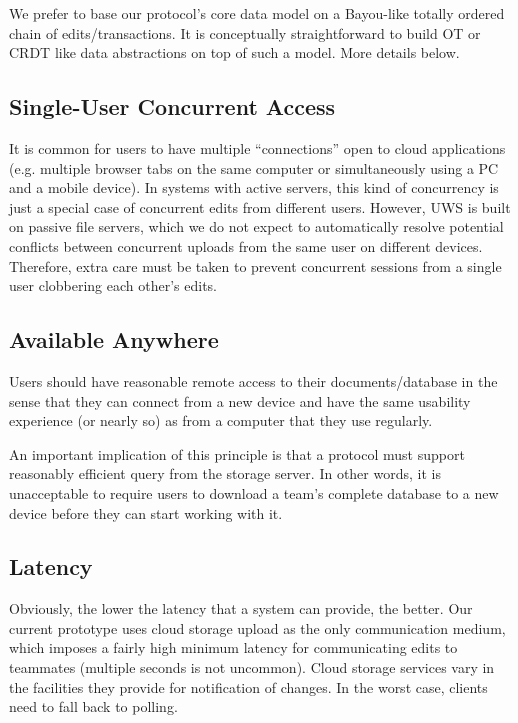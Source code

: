 \documentclass{article}
\begin{document}
We prefer to base our protocol's core data model on a Bayou-like totally ordered chain of edits/transactions.
It is conceptually straightforward to build OT or CRDT like data abstractions on top of such a model.
More details below.

\subsection{Single-User Concurrent Access}

It is common for users to have multiple ``connections'' open to cloud applications (e.g. multiple browser tabs on the same computer or simultaneously using a PC and a mobile device).
In systems with active servers, this kind of concurrency is just a special case of concurrent edits from different users.
However, UWS is built on passive file servers, which we do not expect to automatically resolve potential conflicts between concurrent uploads from the same user on different devices.
Therefore, extra care must be taken to prevent concurrent sessions from a single user clobbering each other's edits.

\subsection{Available Anywhere}

Users should have reasonable remote access to their documents{\slash}database in the sense that they can connect from a new device and have the same usability experience (or nearly so) as from a computer that they use regularly.

An important implication of this principle is that a protocol must support reasonably efficient query from the storage server.
In other words, it is unacceptable to require users to download a team's complete database to a new device before they can start working with it.

\subsection{Latency}

Obviously, the lower the latency that a system can provide, the better.
Our current prototype uses cloud storage upload as the only communication medium, which imposes a fairly high minimum latency for communicating edits to teammates (multiple seconds is not uncommon).
Cloud storage services vary in the facilities they provide for notification of changes.
In the worst case, clients need to fall back to polling.
\end{document}
